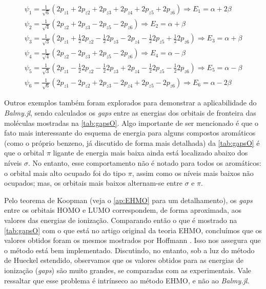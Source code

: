 \begin{equation}
    \begin{split}
\label{wavefunctions}
    \psi_1 = \frac{1}{\sqrt{6}}(2p_{z1} + 2p_{z2} + 2p_{z3} + 2p_{z4} + 2p_{z5} + 2p_{z6}) \Longrightarrow E_1 = \alpha + 2\beta \\[0.35cm]
    \psi_2 = \frac{1}{\sqrt{4}}(2p_{z2} + 2p_{z3} - 2p_{z5} - 2p_{z6}) \Longrightarrow E_2 = \alpha + \beta \\[0.35cm]
   \psi_3 = \frac{1}{\sqrt{3}}(2p_{z1} + \frac{1}{2} 2p_{z2} - \frac{1}{2} 2p_{z3} - 2p_{z4} - \frac{1}{2} 2p_{z5} + \frac{1}{2} 2p_{z6}) \Longrightarrow E_3 = \alpha + \beta \\[0.35cm]
     \psi_4 = \frac{1}{\sqrt{4}}(2p_{z2} - 2p_{z3} + 2p_{z5} - 2p_{z6}) \Longrightarrow E_4 = \alpha - \beta \\[0.35cm]
      \psi_5 = \frac{1}{\sqrt{3}}(2p_{z1} - \frac{1}{2} 2p_{z2} - \frac{1}{2} 2p_{z3} + 2p_{z4} - \frac{1}{2} 2p_{z5} - \frac{1}{2} 2p_{z6}) \Longrightarrow E_5 = \alpha - \beta \\[0.35cm]
      \psi_6 = \frac{1}{\sqrt{6}}(2p_{z1} - 2p_{z2} + 2p_{z3} - 2p_{z4} +  2p_{z5} -  2p_{z6}) \Longrightarrow E_6 = \alpha - 2\beta 
\end{split}
\end{equation}


Outros exemplos também foram explorados para demonstrar a aplicabilidade do \textit{Balmy.jl}, sendo calculados os \textit{gaps} entre as energias dos orbitais de fronteira das moléculas mostradas na \autoref{tab:gapsO}. Algo importante de ser mencionado é que o fato mais interessante do esquema de energia para alguns compostos aromáticos (como o próprio benzeno, já discutido de forma mais detalhada) da \autoref{tab:gapsO} é que o orbital $\pi$ ligante de energia mais baixa ainda está localizado abaixo dos níveis $\sigma$. No entanto, esse comportamento não é notado para todos os aromáticos: o orbital mais alto ocupado foi do tipo $\pi$, assim como os níveis mais baixos não ocupados; mas, os orbitais mais baixos alternam-se entre $\sigma$ e $\pi$.

Pelo teorema de Koopman (veja o \autoref{ap:EHMO} para um detalhamento), os \textit{gaps} entre os orbitais \gls{HOMO} e \gls{LUMO} correspondem, de forma aproximada, aos valores das energias de ionização. Comparando então o que é mostrado na \autoref{tab:gapsO} com o que está no artigo original da teoria \gls{EHMO}, concluímos que os valores obtidos foram os mesmos mostrados por Hoffmann \autocite{Hoffmann1963}. Isso nos assegura que o método está bem implementado. Discutindo, no entanto, sob a luz do método de Hueckel estendido, observamos que os valores obtidos para as energias de ionização (\textit{gaps}) são muito grandes, se comparadas com as experimentais. Vale ressaltar que esse problema é intrínseco ao método \gls{EHMO}, e não ao \textit{Balmy.jl}.

